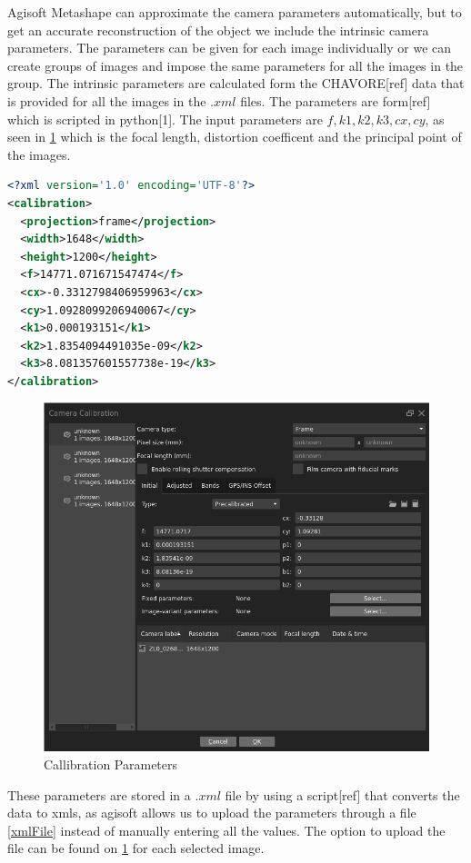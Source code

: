 Agisoft Metashape can approximate the camera parameters automatically, but to get an accurate reconstruction of the object we include the intrinsic camera parameters. The parameters can be given for each image individually or we can create groups of images and impose the same parameters for all the images in the group. The intrinsic parameters are calculated form the CHAVORE[ref] data that is provided for all the images in the $.xml$ files. The parameters are form[ref] which is scripted in python[1]. The input parameters are $f, k1, k2, k3, cx, cy$, as seen in \ref{fig:cameraCalibrationMetashape} which is the focal length, distortion coefficent and the principal point of the images.
\begin{lstlisting}[language=xml, caption=xml file, label=xmlFile]
<?xml version='1.0' encoding='UTF-8'?>
<calibration>
  <projection>frame</projection>
  <width>1648</width>
  <height>1200</height>
  <f>14771.071671547474</f>
  <cx>-0.3312798406959963</cx>
  <cy>1.0928099206940067</cy>
  <k1>0.000193151</k1>
  <k2>1.8354094491035e-09</k2>
  <k3>8.081357601557738e-19</k3>
</calibration>
\end{lstlisting}
\begin{figure}[H]
	\centering
	\includegraphics[scale=0.3]{img/cameraCalibration.png}
	\caption{Callibration Parameters}
	\label{fig:cameraCalibrationMetashape}
\end{figure}
These parameters are stored in a $.xml$ file by using a script[ref] that converts the data to xmls, as agisoft allows us to upload the parameters through a file \ref{xmlFile} instead of manually entering all the values. The option to upload the file can be found on \ref{fig:cameraCalibrationMetashape} for each selected image.
